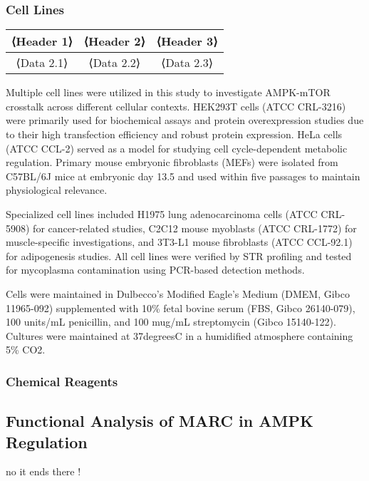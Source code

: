 \documentclass[11pt,a4paper]{article}
\begin{document}
\subsubsection{Cell Lines}

\begin{tabular}{|c|c|c|}
    \hline
    \textbf{⟨Header 1⟩} & \textbf{⟨Header 2⟩} & \textbf{⟨Header 3⟩} \\
    \hline
    ⟨Data 2.1⟩ & ⟨Data 2.2⟩ & ⟨Data 2.3⟩ \\
    \hline
\end{tabular}

Multiple cell lines were utilized in this study to investigate AMPK-mTOR crosstalk across different cellular contexts. HEK293T cells (ATCC CRL-3216) were primarily used for biochemical assays and protein overexpression studies due to their high transfection efficiency and robust protein expression. HeLa cells (ATCC CCL-2) served as a model for studying cell cycle-dependent metabolic regulation. Primary mouse embryonic fibroblasts (MEFs) were isolated from C57BL/6J mice at embryonic day 13.5 and used within five passages to maintain physiological relevance.

Specialized cell lines included H1975 lung adenocarcinoma cells (ATCC CRL-5908) for cancer-related studies, C2C12 mouse myoblasts (ATCC CRL-1772) for muscle-specific investigations, and 3T3-L1 mouse fibroblasts (ATCC CCL-92.1) for adipogenesis studies. All cell lines were verified by STR profiling and tested for mycoplasma contamination using PCR-based detection methods.

Cells were maintained in Dulbecco's Modified Eagle's Medium (DMEM, Gibco 11965-092) supplemented with 10\% fetal bovine serum (FBS, Gibco 26140-079), 100 units/mL penicillin, and 100 mug/mL streptomycin (Gibco 15140-122). Cultures were maintained at 37degreesC in a humidified atmosphere containing 5\% CO2.

\subsubsection{Chemical Reagents}

\subsection{Functional Analysis of MARC in AMPK Regulation}

no it ends there !
\end{document}
